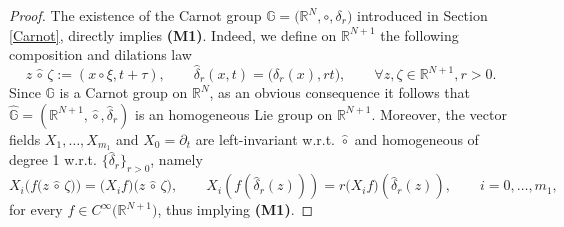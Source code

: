 \documentclass[11pt,a4paper]{article}
\numberwithin{equation}{section}
\newcommand{\R}{\mathbb{R}}
\def \rn {{\mathbb {R}}^{N}}
\def \rnn {{\mathbb {R}}^{N+1}}
\def \GG {{\mathbb{G}}}
\def \p {\partial}
\def \d {{\delta}}
\def \t {{\tau}}
\def \z {{\zeta}}
\begin{document}
{\begin{proof}
	\medskip
	The existence of the Carnot group $\GG = \big(\rn,\circ,\d_r\big)$ introduced in Section \ref{Carnot}, directly implies \textbf{(M1)}. Indeed, we define on $\rnn$ the following composition and dilations law
	\begin{equation}
		z\,\widehat\circ\,\z :=\left(x\circ \xi,t+\t\right),\qquad \widehat\d_{r}(x,t)=\Big(\d_r(x),rt\Big),\qquad \forall z,\z \in \rnn,r>0.
	\end{equation}
	Since $\GG$ is a Carnot group on $\rn$, as an obvious consequence it follows that  $\widehat{\GG} = \left(\rnn,\widehat\circ,\widehat\delta_r\right)$ is  an homogeneous Lie group on $\rnn$. Moreover, the vector fields $X_1,\ldots,X_{m_1}$ and $X_0=\p_t$ are left-invariant  w.r.t. $\widehat \circ$  and homogeneous of degree 1 w.r.t. $\big\{\widehat \delta_r\big\}_{r>0}$, namely
	\begin{equation}
		X_i \Big(f\big(z\,\widehat\circ\,\z\big) \Big)=\big( X_i f\big)\big(z\,\widehat\circ\,\z\big), \qquad X_i \left(f \left(\widehat\d_{r}(z)\right) \right)=r \big(X_i f \big)\left(\widehat\d_{r}(z)\right), \qquad i=0,\ldots, m_1,
	\end{equation}
	for every $f\in C^\infty\big(\R^{N+1}\big)$, thus implying \textbf{(M1)}.
		

\end{proof}}
\end{document}
